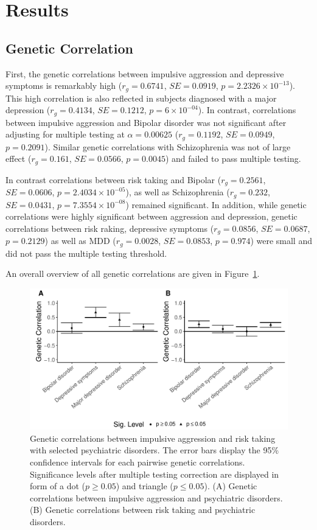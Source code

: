 \section{Results}
\label{sec:results_psych}

\subsection{Genetic Correlation}
\label{sub:psych_genetic_correlation}

First, the genetic correlations between impulsive aggression and depressive symptoms is remarkably high ($r_g=0.6741$, $SE=0.0919$, $p=2.2326\times 10^{-13}$).
This high correlation is also reflected in subjects diagnosed with a major depression ($r_g=0.4134$, $SE=0.1212$, $p=6\times 10^{-04}$).
In contrast, correlations between impulsive aggression and Bipolar disorder was not significant after adjusting for multiple testing at $\alpha=0.00625$ ($r_g=0.1192$, $SE=0.0949$, $p=0.2091$).
Similar genetic correlations with Schizophrenia was not of large effect ($r_g=0.161$, $SE=0.0566$, $p=0.0045$) and failed to pass multiple testing.

In contrast correlations between risk taking and Bipolar ($r_g=0.2561$, $SE=0.0606$, $p=2.4034\times 10^{-05}$), as well as Schizophrenia ($r_g=0.232$, $SE=0.0431$, $p=7.3554\times 10^{-08}$) remained significant.
In addition, while genetic correlations were highly significant between aggression and depression, genetic correlations between risk raking, depressive symptoms ($r_g=0.0856$, $SE=0.0687$, $p=0.2129$) as well as MDD ($r_g=0.0028$, $SE=0.0853$, $p=0.974$) were small and did not pass the multiple testing threshold.

An overall overview of all genetic correlations are given in Figure~\ref{fig:genetic_correlations_psych}.

\begin{figure}[htpb]
  \centering
  \includegraphics[width=0.8\linewidth]{ukb_psychiatric/figures/combined_corr.pdf}
  \caption[Genetic Correlations with psychiatric disorders]{Genetic correlations between impulsive aggression and risk taking with selected psychiatric disorders.
    The error bars display the 95\% confidence intervals for each pairwise genetic correlations.
    Significance levels after multiple testing correction are displayed in form of a dot ($p\ge 0.05$) and triangle ($p\leq0.05$).
    (A) Genetic correlations between impulsive aggression and psychiatric disorders. 
    (B) Genetic correlations between risk taking and psychiatric disorders.
  }\label{fig:genetic_correlations_psych}
\end{figure}


